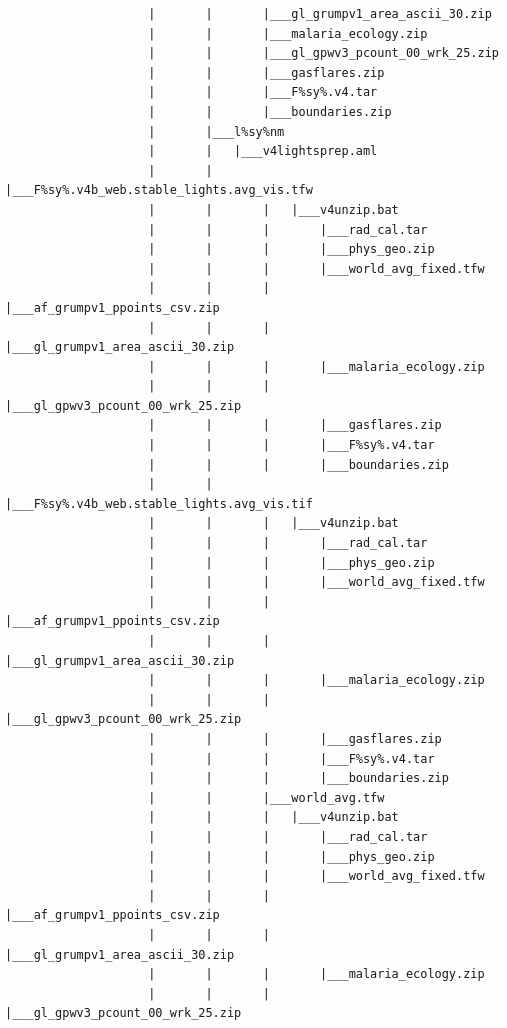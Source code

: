 \documentclass[
]{book}
\begin{document}
\begin{verbatim}
                    |       |       |___gl_grumpv1_area_ascii_30.zip
                    |       |       |___malaria_ecology.zip
                    |       |       |___gl_gpwv3_pcount_00_wrk_25.zip
                    |       |       |___gasflares.zip
                    |       |       |___F%sy%.v4.tar
                    |       |       |___boundaries.zip
                    |       |___l%sy%nm
                    |       |   |___v4lightsprep.aml
                    |       |       |___F%sy%.v4b_web.stable_lights.avg_vis.tfw
                    |       |       |   |___v4unzip.bat
                    |       |       |       |___rad_cal.tar
                    |       |       |       |___phys_geo.zip
                    |       |       |       |___world_avg_fixed.tfw
                    |       |       |       |___af_grumpv1_ppoints_csv.zip
                    |       |       |       |___gl_grumpv1_area_ascii_30.zip
                    |       |       |       |___malaria_ecology.zip
                    |       |       |       |___gl_gpwv3_pcount_00_wrk_25.zip
                    |       |       |       |___gasflares.zip
                    |       |       |       |___F%sy%.v4.tar
                    |       |       |       |___boundaries.zip
                    |       |       |___F%sy%.v4b_web.stable_lights.avg_vis.tif
                    |       |       |   |___v4unzip.bat
                    |       |       |       |___rad_cal.tar
                    |       |       |       |___phys_geo.zip
                    |       |       |       |___world_avg_fixed.tfw
                    |       |       |       |___af_grumpv1_ppoints_csv.zip
                    |       |       |       |___gl_grumpv1_area_ascii_30.zip
                    |       |       |       |___malaria_ecology.zip
                    |       |       |       |___gl_gpwv3_pcount_00_wrk_25.zip
                    |       |       |       |___gasflares.zip
                    |       |       |       |___F%sy%.v4.tar
                    |       |       |       |___boundaries.zip
                    |       |       |___world_avg.tfw
                    |       |       |   |___v4unzip.bat
                    |       |       |       |___rad_cal.tar
                    |       |       |       |___phys_geo.zip
                    |       |       |       |___world_avg_fixed.tfw
                    |       |       |       |___af_grumpv1_ppoints_csv.zip
                    |       |       |       |___gl_grumpv1_area_ascii_30.zip
                    |       |       |       |___malaria_ecology.zip
                    |       |       |       |___gl_gpwv3_pcount_00_wrk_25.zip

\end{verbatim}
\end{document}
